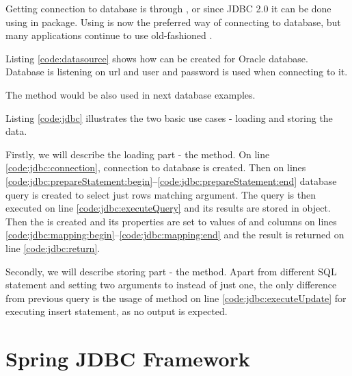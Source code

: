 Getting connection to database is through , or since JDBC 2.0
it can be done using  in  package.
Using  is now the preferred way of connecting to database,
but many applications continue to use old-fashioned .

Listing \ref{code:datasource} shows how  can be created for Oracle database.
Database is listening on url 
and  user and  password is used when connecting to it.

The  method would be also used in next database examples.



Listing \ref{code:jdbc} illustrates the two basic use cases - loading and storing the data.

Firstly, we will describe the loading part - the  method.
On line \ref{code:jdbc:connection}, connection to database is created.
Then on lines \ref{code:jdbc:prepareStatement:begin}--\ref{code:jdbc:prepareStatement:end}
database query is created to select just rows matching  argument.
The query is then executed on line \ref{code:jdbc:executeQuery} and its results are stored
in  object. Then the  is created and its properties are
set to values of  and  columns on lines
\ref{code:jdbc:mapping:begin}--\ref{code:jdbc:mapping:end} and the result is returned on line \ref{code:jdbc:return}.

Secondly, we will describe storing part - the  method.
Apart from different SQL statement and setting two arguments to  instead of just one,
the only difference  from previous query is the usage of  method
on line \ref{code:jdbc:executeUpdate} for executing insert statement, as no output is expected.




\section{Spring JDBC Framework \label{frameworks:jdbcTemplate}}

